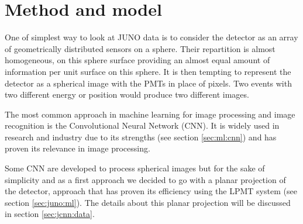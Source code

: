 \documentclass[../main.tex]{subfiles}
\begin{document}
\section{Method and model}

One of simplest way to look at JUNO data is to consider the detector as an array of geometrically distributed sensors on a sphere. Their repartition is almost homogeneous, on this sphere surface providing an almost equal amount of information per unit surface on this sphere. It is then tempting to represent the detector as a spherical image with the PMTs in place of pixels. Two events with two different energy or position would produce two different images.

The most common approach in machine learning for image processing and image recognition is the Convolutional Neural Network (CNN). It is widely used in research and industry \cite{simonyan_very_2015, ciresan_multi-column_2012, abbasi_convolutional_2021, maksimovic_cnns_2021} due to its strengths (see section \ref{sec:ml:cnn}) and has proven its relevance in image processing.

Some CNN are developed to process spherical images \cite{cohen_spherical_2018} but for the sake of simplicity and as a first approach we decided to go with a planar projection of the detector, approach that has proven its efficiency using the LPMT system (see section \ref{sec:juno:ml}). The details about this planar projection will be discussed in section \ref{sec:jcnn:data}.
\end{document}
